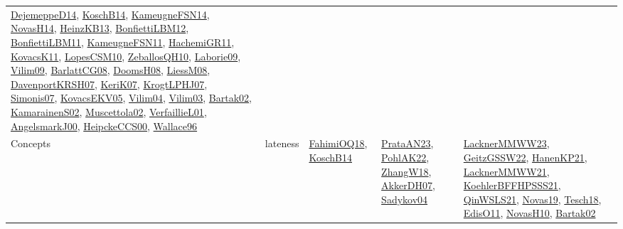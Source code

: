 {\begin{longtable}{llp{6cm}p{6cm}p{6cm}}
\href{papers/DejemeppeD14.pdf}{DejemeppeD14}\cite{DejemeppeD14}, \href{papers/KoschB14.pdf}{KoschB14}\cite{KoschB14}, \href{articles/KameugneFSN14.pdf}{KameugneFSN14}\cite{KameugneFSN14}, \href{articles/NovasH14.pdf}{NovasH14}\cite{NovasH14}, \href{papers/HeinzKB13.pdf}{HeinzKB13}\cite{HeinzKB13}, \href{papers/BonfiettiLBM12.pdf}{BonfiettiLBM12}\cite{BonfiettiLBM12}, \href{papers/BonfiettiLBM11.pdf}{BonfiettiLBM11}\cite{BonfiettiLBM11}, \href{papers/KameugneFSN11.pdf}{KameugneFSN11}\cite{KameugneFSN11}, \href{articles/HachemiGR11.pdf}{HachemiGR11}\cite{HachemiGR11}, \href{articles/KovacsK11.pdf}{KovacsK11}\cite{KovacsK11}, \href{articles/LopesCSM10.pdf}{LopesCSM10}\cite{LopesCSM10}, \href{articles/ZeballosQH10.pdf}{ZeballosQH10}\cite{ZeballosQH10}, \href{papers/Laborie09.pdf}{Laborie09}\cite{Laborie09}, \href{papers/Vilim09.pdf}{Vilim09}\cite{Vilim09}, \href{papers/BarlattCG08.pdf}{BarlattCG08}\cite{BarlattCG08}, \href{papers/DoomsH08.pdf}{DoomsH08}\cite{DoomsH08}, \href{articles/LiessM08.pdf}{LiessM08}\cite{LiessM08}, \href{papers/DavenportKRSH07.pdf}{DavenportKRSH07}\cite{DavenportKRSH07}, \href{papers/KeriK07.pdf}{KeriK07}\cite{KeriK07}, \href{papers/KrogtLPHJ07.pdf}{KrogtLPHJ07}\cite{KrogtLPHJ07}, \href{articles/Simonis07.pdf}{Simonis07}\cite{Simonis07}, \href{papers/KovacsEKV05.pdf}{KovacsEKV05}\cite{KovacsEKV05}, \href{papers/Vilim04.pdf}{Vilim04}\cite{Vilim04}, \href{papers/Vilim03.pdf}{Vilim03}\cite{Vilim03}, \href{papers/Bartak02.pdf}{Bartak02}\cite{Bartak02}, \href{papers/KamarainenS02.pdf}{KamarainenS02}\cite{KamarainenS02}, \href{papers/Muscettola02.pdf}{Muscettola02}\cite{Muscettola02}, \href{papers/VerfaillieL01.pdf}{VerfaillieL01}\cite{VerfaillieL01}, \href{papers/AngelsmarkJ00.pdf}{AngelsmarkJ00}\cite{AngelsmarkJ00}, \href{articles/HeipckeCCS00.pdf}{HeipckeCCS00}\cite{HeipckeCCS00}, \href{articles/Wallace96.pdf}{Wallace96}\cite{Wallace96}\\
Concepts & lateness & \href{articles/FahimiOQ18.pdf}{FahimiOQ18}\cite{FahimiOQ18}, \href{papers/KoschB14.pdf}{KoschB14}\cite{KoschB14} & \href{articles/PrataAN23.pdf}{PrataAN23}\cite{PrataAN23}, \href{articles/PohlAK22.pdf}{PohlAK22}\cite{PohlAK22}, \href{articles/ZhangW18.pdf}{ZhangW18}\cite{ZhangW18}, \href{papers/AkkerDH07.pdf}{AkkerDH07}\cite{AkkerDH07}, \href{papers/Sadykov04.pdf}{Sadykov04}\cite{Sadykov04} & \href{articles/LacknerMMWW23.pdf}{LacknerMMWW23}\cite{LacknerMMWW23}, \href{papers/GeitzGSSW22.pdf}{GeitzGSSW22}\cite{GeitzGSSW22}, \href{papers/HanenKP21.pdf}{HanenKP21}\cite{HanenKP21}, \href{papers/LacknerMMWW21.pdf}{LacknerMMWW21}\cite{LacknerMMWW21}, \href{articles/KoehlerBFFHPSSS21.pdf}{KoehlerBFFHPSSS21}\cite{KoehlerBFFHPSSS21}, \href{articles/QinWSLS21.pdf}{QinWSLS21}\cite{QinWSLS21}, \href{articles/Novas19.pdf}{Novas19}\cite{Novas19}, \href{papers/Tesch18.pdf}{Tesch18}\cite{Tesch18}, \href{papers/EdisO11.pdf}{EdisO11}\cite{EdisO11}, \href{articles/NovasH10.pdf}{NovasH10}\cite{NovasH10}, \href{papers/Bartak02.pdf}{Bartak02}\cite{Bartak02}\\

\end{longtable}}
